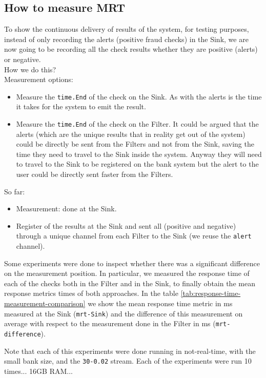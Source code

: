 \documentclass[12pt,a4paper]{article}
\begin{document}
\subsection{How to measure MRT}\label{exp-measuring-mrt}

To show the continuous delivery of results of the system, for testing purposes, instead of only recording the alerts (positive fraud checks) in the Sink, we are now going to be recording all the check results whether they are positive (alerts) or negative.\\
How we do this?\\
Measurement options:
\begin{itemize}
    \item Measure the \texttt{time.End} of the check on the Sink. As with the alerts is the time it takes for the system to emit the result.
    \item Measure the \texttt{time.End} of the check on the Filter. It could be argued that the alerts (which are the unique results that in reality get out of the system) could be directly be sent from the Filters and not from the Sink, saving the time they need to travel to the Sink inside the system. Anyway they will need to travel to the Sink to be registered on the bank system but the alert to the user could be directly sent faster from the Filters.
\end{itemize}

So far:
\begin{itemize}
    \item Measurement: done at the Sink.
    \item Register of the results at the Sink and sent all (positive and negative) through a unique channel from each Filter to the Sink (we reuse the \texttt{alert} channel).
\end{itemize}

Some experiments were done to inspect whether there was a significant difference on the measurement position. In particular, we measured the response time of each of the checks both in the Filter and in the Sink, to finally obtain the mean response metrics times of both approaches. In the table \ref{tab:response-time-measurement-comparison} we show the mean response time metric in ms measured at the Sink (\texttt{mrt-Sink}) and the difference of this measurement on average with respect to the measurement done in the Filter in ms (\texttt{mrt-difference}).

Note that each of this experiments were done running in not-real-time, with the small bank size, and the \texttt{30-0.02} stream. Each of the experiments were run 10 times... 16GB RAM...
\end{document}
